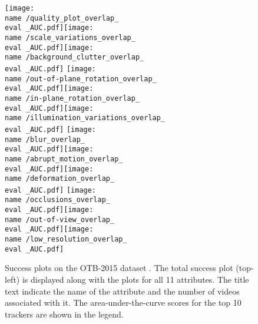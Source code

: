 \documentclass[10pt,twocolumn,letterpaper]{article}
\begin{document}
\begin{figure*}[!t]
	\centering
	\newcommand{\wid}{0.33\textwidth}
	\newcommand{\name}{figures/sota_OTB100}
	\newcommand{\eval}{OPE}
	\texttt{[image: \\name /quality\_plot\_overlap\_\\eval \_AUC.pdf]}\texttt{[image: \\name /scale\_variations\_overlap\_\\eval \_AUC.pdf]}\texttt{[image: \\name /background\_clutter\_overlap\_\\eval \_AUC.pdf]}
	\texttt{[image: \\name /out-of-plane\_rotation\_overlap\_\\eval \_AUC.pdf]}\texttt{[image: \\name /in-plane\_rotation\_overlap\_\\eval \_AUC.pdf]}\texttt{[image: \\name /illumination\_variations\_overlap\_\\eval \_AUC.pdf]}
	\texttt{[image: \\name /blur\_overlap\_\\eval \_AUC.pdf]}\texttt{[image: \\name /abrupt\_motion\_overlap\_\\eval \_AUC.pdf]}\texttt{[image: \\name /deformation\_overlap\_\\eval \_AUC.pdf]}
	\texttt{[image: \\name /occlusions\_overlap\_\\eval \_AUC.pdf]}\texttt{[image: \\name /out-of-view\_overlap\_\\eval \_AUC.pdf]}\texttt{[image: \\name /low\_resolution\_overlap\_\\eval \_AUC.pdf]}
	\caption{Success plots on the OTB-2015 dataset \cite{OTB2015}. The total success plot (top-left) is displayed along with the plots for all 11 attributes. The title text indicate the name of the attribute and the number of videos associated with it. The area-under-the-curve scores for the top 10 trackers are shown in the legend.}
	\label{fig:attribute}
\end{figure*} 
\end{document}

